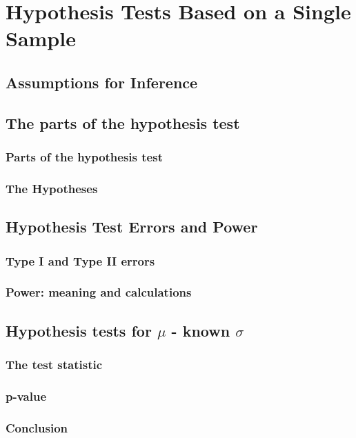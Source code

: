 \chapter{Hypothesis Tests Based on a Single Sample}  %

\section{Assumptions for Inference}  %

\section{The parts of the hypothesis test}  %
\subsection{Parts of the hypothesis test}  %
\subsection{The Hypotheses}  %

\section{Hypothesis Test Errors and Power}  %
\subsection{Type I and Type II errors}  %
\subsection{Power: meaning and calculations}  %

\section{Hypothesis tests for \(\mu\) - known $\sigma$}  %
\subsection{The test statistic}  %
\subsection{p-value}  %
\subsection{Conclusion}  %
